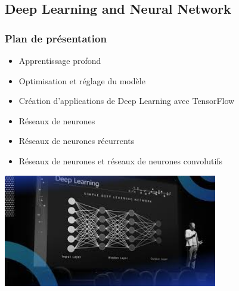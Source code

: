 \documentclass{beamer}
\begin{document}
\subsection{Deep Learning and Neural Network}
\begin{frame}
	\frametitle{Plan de présentation}
	\begin{itemize}
		\item Apprentissage profond
		\item Optimisation et réglage du modèle
		\item Création d'applications de Deep Learning avec TensorFlow
		\item Réseaux de neurones
		\item Réseaux de neurones récurrents
		\item Réseaux de neurones et réseaux de neurones convolutifs
	\end{itemize}
			\begin{center}
	\includegraphics[width=0.7\textwidth]{depl.jpeg}
\end{center}
\end{frame}
\end{document}
